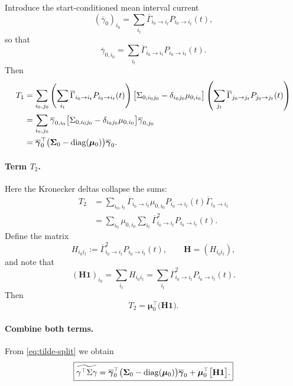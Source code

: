 \documentclass[11pt]{article}
\begin{document}
Introduce the start-conditioned mean interval current
\[
  (\overline{\gamma}_0)_{i_0}
  =
  \sum_{i_t}
  \overline{\Gamma}_{i_0\to i_t}
  P_{i_0\to i_t}(t),
\]
so that
\[
  \overline{\gamma}_{0,i_0}
  =
  \sum_{i_t}
  \overline{\Gamma}_{i_0\to i_t}
  P_{i_0\to i_t}(t).
\]
Then
\begin{align*}
  T_1
  &=
  \sum_{i_0,j_0}
  \left(
    \sum_{i_t}
    \overline{\Gamma}_{i_0\to i_t}
    P_{i_0\to i_t}(t)
  \right)
  \bigl[
    \Sigma_{0,i_0 j_0}
    - \delta_{i_0 j_0}\mu_{0,i_0}
  \bigr]
  \left(
    \sum_{j_t}
    \overline{\Gamma}_{j_0\to j_t}
    P_{j_0\to j_t}(t)
  \right)
  \\
  &=
  \sum_{i_0,j_0}
  \overline{\gamma}_{0,i_0}
  \bigl[
    \Sigma_{0,i_0 j_0}
    - \delta_{i_0 j_0}\mu_{0,i_0}
  \bigr]
  \overline{\gamma}_{0,j_0}
  \\
  &=
  \overline{\boldsymbol{\gamma}}_0^\top
  \bigl(\boldsymbol{\Sigma}_0-\operatorname{diag}(\boldsymbol{\mu}_0)\bigr)
  \overline{\boldsymbol{\gamma}}_0.
\end{align*}

\paragraph{Term \(T_2\).}

Here the Kronecker deltas collapse the sums:
\begin{align*}
  T_2
  &=
  \sum_{i_0,i_t}
  \overline{\Gamma}_{i_0\to i_t}
  \mu_{0,i_0}P_{i_0\to i_t}(t)
  \overline{\Gamma}_{i_0\to i_t}
  \\
  &=
  \sum_{i_0}
  \mu_{0,i_0}
  \sum_{i_t}
  \overline{\Gamma}_{i_0\to i_t}^2
  P_{i_0\to i_t}(t).
\end{align*}
Define the matrix
\[
  H_{i_0 i_t}
  :=
  \overline{\Gamma}_{i_0\to i_t}^2
  P_{i_0\to i_t}(t),
  \qquad
  \mathbf{H}
  = (H_{i_0 i_t}),
\]
and note that
\[
  (\mathbf{H}\mathbf{1})_{i_0}
  =
  \sum_{i_t}
  H_{i_0 i_t}
  =
  \sum_{i_t}
  \overline{\Gamma}_{i_0\to i_t}^2
  P_{i_0\to i_t}(t).
\]
Then
\[
  T_2
  =
  \boldsymbol{\mu}_0^\top
  \bigl(\mathbf{H}\mathbf{1}\bigr).
\]

\paragraph{Combine both terms.}

From \eqref{eq:tilde-split} we obtain
\[
  \boxed{
    \widetilde{\gamma^\top\Sigma\gamma}
    =
    \overline{\boldsymbol{\gamma}}_0^\top
    \bigl(\boldsymbol{\Sigma}_0-\operatorname{diag}(\boldsymbol{\mu}_0)\bigr)
    \overline{\boldsymbol{\gamma}}_0
    +
    \boldsymbol{\mu}_0^\top
    \bigl[\mathbf{H}\mathbf{1}\bigr].
  }
\]
\end{document}
